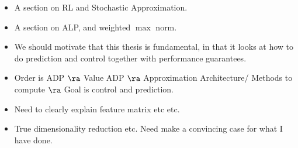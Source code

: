 \begin{itemize}
\item A section on RL and Stochastic Approximation.
\item A section on ALP, and weighted $\max$ norm.
\item We should motivate that this thesis is fundamental, in that it looks at how to do prediction and control together with performance guarantees.
\item Order is ADP $\ra$ Value ADP $\ra$ Approximation Architecture/ Methods to compute $\ra$ Goal is control and prediction.
\item Need to clearly explain feature matrix etc etc.
\item True dimensionality reduction etc. Need make a convincing case for what I have done.
\end{itemize}
